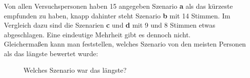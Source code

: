 \documentclass{Paper}
\begin{document}
Von allen Versuchspersonen haben 15 angegeben Szenario \textbf{a} als das kürzeste empfunden zu haben, knapp dahinter steht Szenario \textbf{b} mit 14 Stimmen. Im Vergleich dazu sind die Szenarien \textbf{c} und \textbf{d} mit 9 und 8 Stimmen etwas abgeschlagen. Eine eindeutige Mehrheit gibt es dennoch nicht.\\
Gleichermaßen kann man feststellen, welches Szenario von den meisten Personen als das längste bewertet wurde:

\begin{figure}[ht]
\caption{Welches Szenario war das längste?}
\label{SzenarienLang}
\end{figure}       
\end{document}
